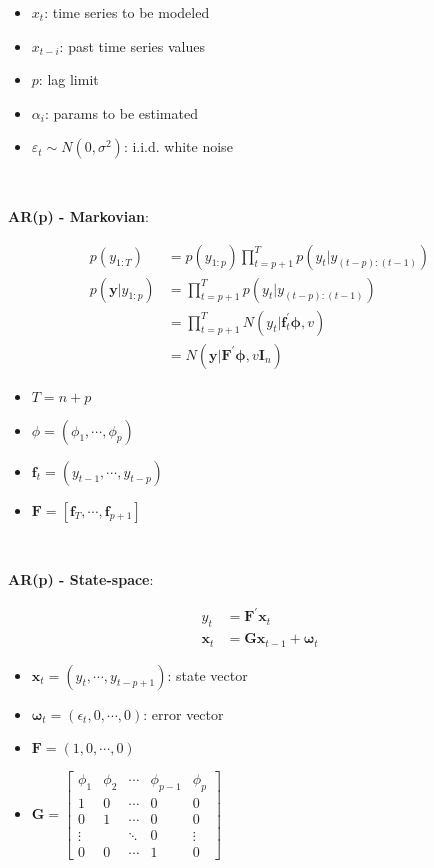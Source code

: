\documentclass[
]{book}
\providecommand{\tightlist}{%
  \setlength{\itemsep}{0pt}\setlength{\parskip}{0pt}}
\begin{document}
\begin{itemize}
\tightlist
\item
  \(x_t\): time series to be modeled
\item
  \(x_{t-i}\): past time series values
\item
  \(p\): lag limit
\item
  \(\alpha_i\): params to be estimated
\item
  \(\varepsilon_t \sim N(0,\sigma^2)\): i.i.d. white noise
\end{itemize}

~

\textbf{AR(p) - Markovian}:

\[\begin{align*}
        p(y_{1:T})&=p(y_{1:p})\prod_{t=p+1}^{T}{p(y_t|y_{(t-p):(t-1)})}\\
        p(\bm{y}|y_{1:p})&=\prod_{t=p+1}^{T}{p(y_t|y_{(t-p):(t-1)})}\\
        &=\prod_{t=p+1}^{T}{N(y_t|\bm{f}_t^\prime\bm{\phi},v)}\\
        &=N(\bm{y}|\bm{F}^\prime\bm{\phi},v\bm{I}_n)
    \end{align*}\]

\begin{itemize}
\tightlist
\item
  \(T=n+p\)
\item
  \(\phi=(\phi_1,\cdots,\phi_p)\)
\item
  \(\bm{f}_t=(y_{t-1},\cdots,y_{t-p})\)
\item
  \(\bm{F}=[\bm{f}_T,\cdots,\bm{f}_{p+1}]\)
\end{itemize}

~

\textbf{AR(p) - State-space}:

\[\begin{align*}
        y_t&=\bm{F}^\prime\bm{x}_t\\
        \bm{x}_t&=\bm{G}\bm{x}_{t-1}+\bm{\omega}_t
    \end{align*}\]

\begin{itemize}
\tightlist
\item
  \(\bm{x}_t=(y_t,\cdots,y_{t-p+1})\): state vector
\item
  \(\bm{\omega}_t=(\epsilon_t,0,\cdots,0)\): error vector
\item
  \(\bm{F}=(1,0,\cdots,0)\)
\item
  \(\bm{G}=\begin{bmatrix}\phi_1 & \phi_2 & \cdots & \phi_{p-1} & \phi_p \\ 1 & 0 & \cdots & 0 & 0 \\ 0 & 1 & \cdots & 0 & 0 \\ \vdots & & \ddots & 0 & \vdots \\ 0 & 0 & \cdots & 1 & 0\end{bmatrix}\)
\end{itemize}
\end{document}

